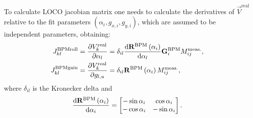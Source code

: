 To calculate LOCO jacobian matrix one needs to calculate the derivatives of $\vec{V}^{\mathrm{real}}$ relative to the fit parameters $\left(\alpha_i, g_{x, i}, g_{y, i}\right)$, which are assumed to be independent parameters, obtaining:
\begin{align}
    J_{kl}^{\mathrm{BPMroll}} = \dfrac{\partial {V}_k^{\mathrm{real}}}{\partial \alpha_l} &= \delta_{il}\dfrac{\mathrm{d} \mathbf{R}^\mathrm{BPM}\left(\alpha_i\right)}{\mathrm{d} \alpha_l} \mathbf{G}_{i}^{\mathrm{BPM}} {M}^{\mathrm{meas.}}_{ij}, \\
    J_{kl}^{\mathrm{BPMgain}} = \dfrac{\partial {V}_k^{\mathrm{real}}}{\partial g_{l, u}} &= \delta_{il}\mathbf{R}^\mathrm{BPM}\left(\alpha_i\right){M}^{\mathrm{meas.}}_{ij},
\end{align}
where $\delta_{il}$ is the Kronecker delta and 
\begin{equation*}
    \dfrac{\mathrm{d} \mathbf{R}^\mathrm{BPM}\left(\alpha_i\right)}{\mathrm{d} \alpha_i} =
    \begin{bmatrix}
    -\sin\alpha_i & \cos\alpha_i \\
     -\cos\alpha_i & -\sin\alpha_i 
    \end{bmatrix}.
\end{equation*}

